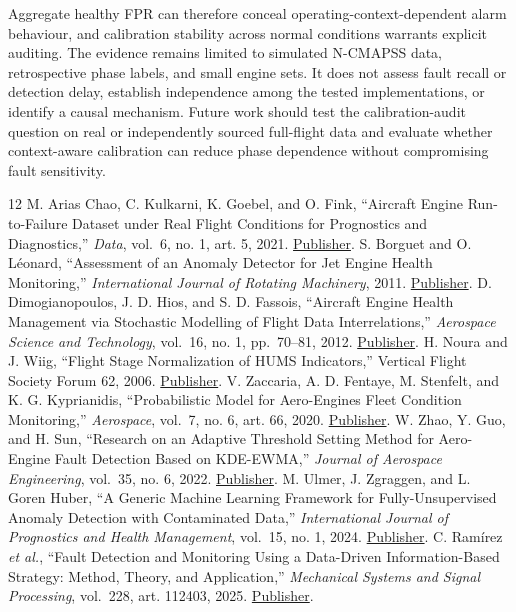 \documentclass[10pt,conference]{IEEEtran}
\begin{document}
Aggregate healthy FPR can therefore conceal operating-context-dependent alarm behaviour, and calibration stability across normal conditions warrants explicit auditing. The evidence remains limited to simulated N-CMAPSS data, retrospective phase labels, and small engine sets. It does not assess fault recall or detection delay, establish independence among the tested implementations, or identify a causal mechanism. Future work should test the calibration-audit question on real or independently sourced full-flight data and evaluate whether context-aware calibration can reduce phase dependence without compromising fault sensitivity.
\begin{thebibliography}{12}
 M. Arias Chao, C. Kulkarni, K. Goebel, and O. Fink, ``Aircraft Engine Run-to-Failure Dataset under Real Flight Conditions for Prognostics and Diagnostics,'' \emph{Data}, vol.~6, no. 1, art. 5, 2021. \href{https://doi.org/10.3390/data6010005}{Publisher}.
 S. Borguet and O. Léonard, ``Assessment of an Anomaly Detector for Jet Engine Health Monitoring,'' \emph{International Journal of Rotating Machinery}, 2011. \href{https://doi.org/10.1155/2011/942576}{Publisher}.
 D. Dimogianopoulos, J. D. Hios, and S. D. Fassois, ``Aircraft Engine Health Management via Stochastic Modelling of Flight Data Interrelations,'' \emph{Aerospace Science and Technology}, vol.~16, no. 1, pp.~70--81, 2012. \href{https://doi.org/10.1016/j.ast.2011.03.002}{Publisher}.
 H. Noura and J. Wiig, ``Flight Stage Normalization of HUMS Indicators,'' Vertical Flight Society Forum 62, 2006. \href{https://doi.org/10.4050/VFS-F62-051}{Publisher}.
 V. Zaccaria, A. D. Fentaye, M. Stenfelt, and K. G. Kyprianidis, ``Probabilistic Model for Aero-Engines Fleet Condition Monitoring,'' \emph{Aerospace}, vol.~7, no. 6, art. 66, 2020. \href{https://doi.org/10.3390/aerospace7060066}{Publisher}.
 W. Zhao, Y. Guo, and H. Sun, ``Research on an Adaptive Threshold Setting Method for Aero-Engine Fault Detection Based on KDE-EWMA,'' \emph{Journal of Aerospace Engineering}, vol.~35, no. 6, 2022. \href{https://doi.org/10.1061/(ASCE)AS.1943-5525.0001483}{Publisher}.
 M. Ulmer, J. Zgraggen, and L. Goren Huber, ``A Generic Machine Learning Framework for Fully-Unsupervised Anomaly Detection with Contaminated Data,'' \emph{International Journal of Prognostics and Health Management}, vol.~15, no. 1, 2024. \href{https://doi.org/10.36001/IJPHM.2024.v15i1.3589}{Publisher}.
 C. Ramírez \emph{et al.}, ``Fault Detection and Monitoring Using a Data-Driven Information-Based Strategy: Method, Theory, and Application,'' \emph{Mechanical Systems and Signal Processing}, vol.~228, art. 112403, 2025. \href{https://doi.org/10.1016/j.ymssp.2025.112403}{Publisher}.

\end{thebibliography}
\end{document}
